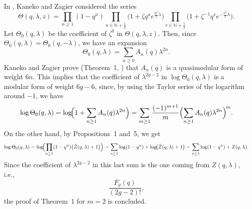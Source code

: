 \documentclass{article}
\numberwithin{equation}{section}
\numberwithin{figure}{section}
\theoremstyle{plain}
\theoremstyle{definition}
\numberwithin{equation}{section}
\newtheorem[S, bodystyle=\normalfont\noindent]{defiS}{Definition}[section]
\begin{document}
In \cite{Kaneko}, Kaneko and Zagier considered the series
\[
\Theta(q,\lambda,z)=\prod_{n\geq 1}(1-q^n)\prod_{u\in \mathbb{N}+\frac{1}{2}}\bigl(1+\zeta q^u e^{\frac{u^2}{2}\lambda}\bigr)\prod_{v\in \mathbb{N}+\frac{1}{2}}\bigl(1+\zeta^{-1} q^v e^{-\frac{v^2}{2}\lambda}\bigr).
\]
Let $\Theta_0(q,\lambda)$ be the coefficient of $\zeta^0$ in $\Theta(q,\lambda,z)$. Then, since $\Theta_0(q,\lambda)=\Theta_0(q,-\lambda)$, we have an expansion
\[
\Theta_0(q,\lambda)=\sum_{n\geq 0} A_n(q)\lambda^{2n}.
\]
Kaneko and Zagier prove (Theorem~1, \cite{Kaneko}) that $A_n(q)$ is a quasimodular form of weight $6n$. This implies that the coefficient of $\lambda^{2g-2}$ in $\log  \Theta_0(q,\lambda)$ is a modular form of weight $6g-6$, since, by using the Taylor series of the logarithm around $-1$, we have
\[
\log \Theta_0(q,\lambda)=\log\!\Bigl(1+\sum_{n\geq 1} A_n(q)\lambda^{2n}\Bigr)=\sum_{m\geq 1}\frac{(-1)^{m+1}}{m}\Bigl(\sum_{n\geq 1} A_n(q)\lambda^{2n}\Bigr)^{\!m}.
\]
On the other hand, by Propositions~1 and~5, we get
\[
\log \Theta_0(q,\lambda)=\log\!\Bigl(\prod_{n\geq 1}(1-q^n)\bigl(\hat{Z}(q,\lambda)+1\bigr)\Bigr)=\sum_{n\geq 1}\log(1-q^n)+\log\!\bigl(\hat{Z}(q,\lambda)+1\bigr)=\sum_{n\geq 1}\log(1-q^n)+Z(q,\lambda).
\]
Since the coefficient of $\lambda^{2g-2}$ in this last sum is the one coming from $Z(q,\lambda)$, i.e.,
\[
\frac{F_g(q)}{(2g-2)!},
\]
the proof of Theorem~1 for $m=2$ is concluded.


\printbibliography
\end{document}
